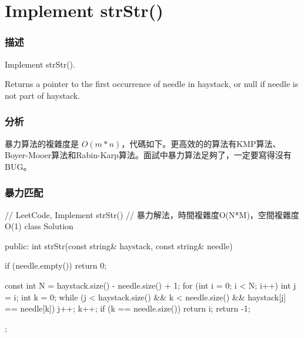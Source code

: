 \section{Implement strStr()} %
\label{sec:strstr}


\subsubsection{描述}
Implement strStr().

Returns a pointer to the first occurrence of needle in haystack, or null if needle is not part of haystack.


\subsubsection{分析}
暴力算法的複雜度是 $O(m*n)$，代碼如下。更高效的的算法有KMP算法、Boyer-Mooer算法和Rabin-Karp算法。面試中暴力算法足夠了，一定要寫得沒有BUG。


\subsubsection{暴力匹配}
\begin{Code}
// LeetCode, Implement strStr()
// 暴力解法，時間複雜度O(N*M)，空間複雜度O(1)
class Solution {
public:
    int strStr(const string& haystack, const string& needle) {
        if (needle.empty()) return 0;

        const int N = haystack.size() - needle.size() + 1;
        for (int i = 0; i < N; i++) {
            int j = i;
            int k = 0;
            while (j < haystack.size() && k < needle.size() && haystack[j] == needle[k]) {
                j++;
                k++;
            }
            if (k == needle.size()) return i;
        }
        return -1;
    }
};
\end{Code}


